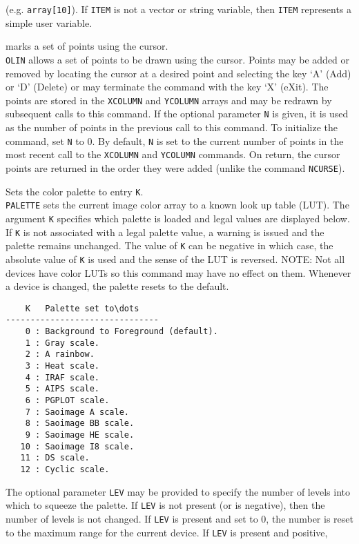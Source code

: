 	(e.g.  {\tt array[10]}).  If {\tt ITEM} is not a
	vector or string variable, then {\tt ITEM} represents a
	simple user variable.
\item [{\tt OLIN [n] } --] marks a set of points using the cursor.\\
	{\tt OLIN} allows a set of points to be drawn using the
	cursor.  Points may be added or removed by locating the cursor
	at a desired point and selecting the key `A' (Add) or `D' (Delete)
	or may terminate the command with the key `X' (eXit).  The points
	are stored in the {\tt XCOLUMN} and
	{\tt YCOLUMN} arrays and may be
	redrawn by subsequent calls to this command.  If the optional
	parameter {\tt N} is given, it is used as the number of
	points in the previous call to this command.  To initialize the
	command, set {\tt N} to 0.  By default, {\tt N}
	is set to the current number of points in the most recent call
	to the {\tt XCOLUMN}
	and {\tt YCOLUMN} commands.  On
	return, the cursor points are returned in the order they were
	added (unlike the command {\tt NCURSE}).
\item [{\tt PALETTE K [LEV] } --] Sets the color palette to entry {\tt K}.\\
	{\tt PALETTE} sets the current image color array to a
	known look up table (LUT).  The argument {\tt K} specifies
	which palette is loaded and legal values are displayed below.
	If {\tt K} is not associated with a legal palette value,
	a warning is issued and the palette remains unchanged.  The
	value of {\tt K} can be negative in which case, the
	absolute value of {\tt K} is used and the sense of the LUT
	is reversed.
	NOTE: Not all devices have color LUTs so this
	command may have no effect on them.  Whenever a device is
	changed, the palette resets to the default.
	\begin{verbatim}
    K   Palette set to\dots
-------------------------------
    0 : Background to Foreground (default).
    1 : Gray scale.
    2 : A rainbow.
    3 : Heat scale.
    4 : IRAF scale.
    5 : AIPS scale.
    6 : PGPLOT scale.
    7 : Saoimage A scale.
    8 : Saoimage BB scale.
    9 : Saoimage HE scale.
   10 : Saoimage I8 scale.
   11 : DS scale.
   12 : Cyclic scale.
	\end{verbatim}
	The optional parameter {\tt LEV} may be provided to
	specify the number of levels into which to squeeze the palette.
	If {\tt LEV} is not present (or is negative), then the
	number of levels is not changed.  If {\tt LEV} is present
	and set to 0, the number is reset to the maximum range for the
	current device.  If {\tt LEV} is present and positive,
